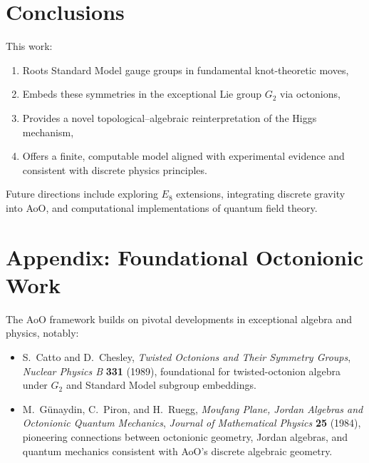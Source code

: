 \documentclass[12pt]{article}
\theoremstyle{remark}
\begin{document}
\section{Conclusions}

This work:

\begin{enumerate}
    \item Roots Standard Model gauge groups in fundamental knot-theoretic moves,
    \item Embeds these symmetries in the exceptional Lie group $G_2$ via octonions,
    \item Provides a novel topological--algebraic reinterpretation of the Higgs mechanism,
    \item Offers a finite, computable model aligned with experimental evidence and consistent with discrete physics principles.
\end{enumerate}

Future directions include exploring $E_8$ extensions, integrating discrete gravity into AoO, and computational implementations of quantum field theory.

\appendix
\section*{Appendix: Foundational Octonionic Work}

The AoO framework builds on pivotal developments in exceptional algebra and physics, notably:

\begin{itemize}
    \item S.~Catto and D.~Chesley, 
    \emph{Twisted Octonions and Their Symmetry Groups}, \textit{Nuclear Physics B} \textbf{331} (1989), foundational for twisted-octonion algebra under $G_2$ and Standard Model subgroup embeddings.
    \item M.~Günaydin, C.~Piron, and H.~Ruegg,
    \emph{Moufang Plane, Jordan Algebras and Octonionic Quantum Mechanics}, 
    \textit{Journal of Mathematical Physics} \textbf{25} (1984), pioneering connections between octonionic geometry, Jordan algebras, and quantum mechanics consistent with AoO’s discrete algebraic geometry.
\end{itemize}
\end{document}
